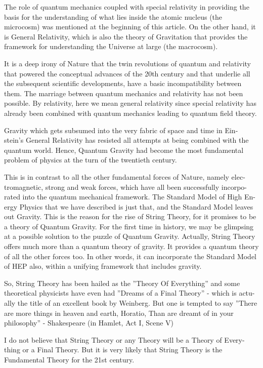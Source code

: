 The role of quantum mechanics coupled with special relativity in providing the
basis for the understanding of what lies inside the atomic nucleus (the microcosm)
was mentioned at the beginning of this article. On the other hand, it is General
Relativity, which is also the theory of Gravitation that provides the framework for
understanding the Universe at large (the macrocosm).


It is a deep irony of Nature that the twin revolutions of quantum and relativity
that powered the conceptual advances of the 20th century and that underlie all the
subsequent scientific developments, have a basic incompatibility between them.
The marriage between quantum mechanics and relativity has not been possible.
By relativity, here we mean general relativity since special relativity has already
been combined with quantum mechanics leading to quantum field theory.

Gravity which gets subsumed into the very fabric of space and time in Ein-
stein’s General Relativity has resisted all attempts at being combined with the
quantum world. Hence, Quantum Gravity had become the most fundamental
problem of physics at the turn of the twentieth century.

This is in contrast to all the other fundamental forces of Nature, namely elec-
tromagnetic, strong and weak forces, which have all been successfully incorpo-rated into the quantum mechanical framework. The Standard Model of High En-
ergy Physics that we have described is just that, and the Standard Model leaves
out Gravity. This is the reason for the rise of String Theory, for it promises to be
a theory of Quantum Gravity. For the first time in history, we may be glimpsing
at a possible solution to the puzzle of Quantum Gravity. Actually, String Theory
offers much more than a quantum theory of gravity. It provides a quantum theory
of all the other forces too. In other words, it can incorporate the Standard Model
of HEP also, within a unifying framework that includes gravity.


So, String Theory has been hailed as the ”Theory Of Everything” and some
theoretical physicists have even had ”Dreams of a Final Theory” - which is actu-
ally the title of an excellent book by Weinberg. But one is tempted to say
”There are more things in heaven and earth, Horatio,
Than are dreamt of in your philosophy” - Shakespeare (in Hamlet, Act I, Scene V)


I do not believe that String Theory or any Theory will be a Theory of Every-
thing or a Final Theory. But it is very likely that String Theory is the Fundamental
Theory for the 21st century.


